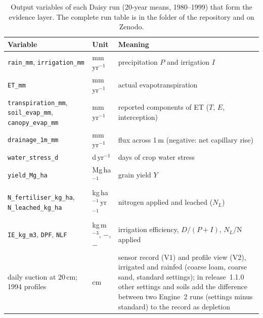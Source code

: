 \begin{table}[H]\centering\small
\caption{Output variables of each Daisy run (20-year means, 1980--1999) that form the evidence layer. The complete run table is in the \datalink{} folder of the repository and on Zenodo.}
\label{tab:daisyvars}
\begin{tabularx}{\textwidth}{>{\raggedright\arraybackslash}p{4.3cm}lX}
\toprule
Variable & Unit & Meaning\\\midrule
\texttt{rain\_mm}, \texttt{irrigation\_mm} & mm\,yr$^{-1}$ & precipitation $P$ and irrigation $I$\\
\texttt{ET\_mm} & mm\,yr$^{-1}$ & actual evapotranspiration\\
\texttt{transpiration\_mm}, \texttt{soil\_evap\_mm}, \texttt{canopy\_evap\_mm} & mm\,yr$^{-1}$ & reported components of ET ($T$, $E$, interception)\\
\texttt{drainage\_1m\_mm} & mm\,yr$^{-1}$ & flux across 1\,m (negative: net capillary rise)\\
\texttt{water\_stress\_d} & d\,yr$^{-1}$ & days of crop water stress\\
\texttt{yield\_Mg\_ha} & Mg\,ha$^{-1}$ & grain yield $Y$\\
\texttt{N\_fertiliser\_kg\_ha}, \texttt{N\_leached\_kg\_ha} & kg\,ha$^{-1}$\,yr$^{-1}$ & nitrogen applied and leached ($N_L$)\\
\texttt{IE\_kg\_m3}, \texttt{DPF}, \texttt{NLF} & kg\,m$^{-3}$, $-$, $-$ & irrigation efficiency, $D/(P+I)$, $N_L$/N applied\\
daily suction at 20\,cm; 1994 profiles & cm & sensor record (V1) and profile view (V2), irrigated and rainfed (coarse loam, coarse sand, standard settings); in release~1.1.0 other settings and soils add the difference between two Engine~2 runs (settings minus standard) to the record as depletion\\\bottomrule
\end{tabularx}
\end{table}

